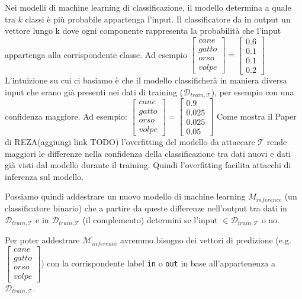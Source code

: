 Nei modelli di machine learning di classificazione, il modello determina
a quale tra \(k\) classi è più probabile appartenga l'input. Il
classificatore da in output un vettore lungo k dove ogni componente
rappresenta la probabilità che l'input appartenga alla corrispondente
classe. Ad esempio
\(\begin{bmatrix}cane\\gatto\\orso\\volpe \end{bmatrix}=\begin{bmatrix}0.6\\0.1\\0.1\\0.2 \end{bmatrix}\)
L'intuizione su cui ci basiamo è che il modello classificherà in maniera
diversa input che erano già presenti nei dati di training
(\(\mathcal D_{train,\mathcal T}\)), per esempio con una confidenza
maggiore. Ad esempio:
\(\begin{bmatrix}cane\\gatto\\orso\\volpe \end{bmatrix}=\begin{bmatrix}0.9\\0.025\\0.025\\0.05 \end{bmatrix}\)
Come mostra il Paper di REZA(aggiungi link TODO) l'overfitting del
modello da attaccare \(\mathcal T\) rende maggiori le differenze nella
confidenza della classificazione tra dati nuovi e dati già visti dal
modello durante il training. Quindi l'overfitting facilita attacchi di
inferenza sul modello.

Possiamo quindi addestrare un nuovo modello di machine learning
\(M_{inference}\) (un classificatore binario) che a partire da queste
differenze nell'output tra dati in \(\mathcal D_{train,\mathcal T}\) e
in \(\overline{ \mathcal D_{train,\mathcal T}}\) (il complemento)
determini se l'input \(\in \mathcal D_{train,\mathcal T}\) o no.

Per poter addestrare \(\mathcal M_{inference}\) avremmo bisogno dei
vettori di predizione
(e.g.~\(\begin{bmatrix}cane\\gatto\\orso\\volpe \end{bmatrix}\)) con la
corrispondente label \texttt{in} o \texttt{out} in base all'appartenenza
a \(\mathcal D_{train,\mathcal T}\).


